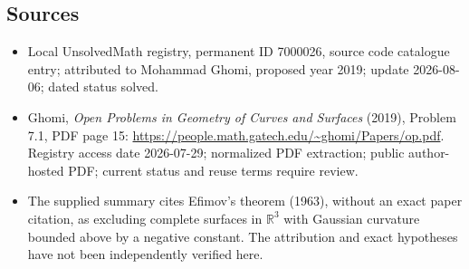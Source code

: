 \documentclass[11pt]{article}
\newcommand{\R}{\mathbb{R}}
\begin{document}
\subsection{Sources}
\begin{itemize}
\item Local UnsolvedMath registry, permanent ID 7000026, source code catalogue entry; attributed to Mohammad Ghomi, proposed year 2019; update 2026-08-06; dated status solved.
\item Ghomi, \emph{Open Problems in Geometry of Curves and Surfaces} (2019), Problem 7.1, PDF page 15: \url{https://people.math.gatech.edu/~ghomi/Papers/op.pdf}. Registry access date 2026-07-29; normalized PDF extraction; public author-hosted PDF; current status and reuse terms require review.
\item The supplied summary cites Efimov's theorem (1963), without an exact paper citation, as excluding complete surfaces in \(\R^3\) with Gaussian curvature bounded above by a negative constant. The attribution and exact hypotheses have not been independently verified here.
\end{itemize}
\end{document}
